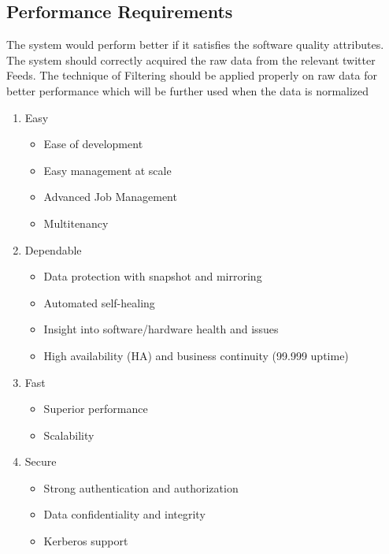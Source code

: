 \documentclass[oneside,a4paper,12pt]{book}
\begin{document}
\subsection{Performance Requirements}
The system would perform better if it satisfies the software quality attributes. The system should correctly acquired the raw data from the relevant twitter Feeds. The technique of Filtering should be applied properly on raw data for better performance which will be further used when the data is normalized
\begin{enumerate}
    \item Easy
        \begin{itemize}
            \item Ease of development
            \item Easy management at scale
            \item Advanced Job  Management
            \item Multitenancy
        \end{itemize}
        \item Dependable
        \begin{itemize}
            \item Data protection with snapshot and mirroring
            \item Automated self-healing
            \item Insight into software/hardware health and issues
            \item High availability (HA) and business continuity (99.999 uptime)
        \end{itemize}
        \item Fast
             \begin{itemize}
            \item Superior performance
            \item Scalability
        \end{itemize}
        \item Secure
             \begin{itemize}
            \item Strong authentication and authorization
            \item Data confidentiality and integrity
            \item Kerberos support
        \end{itemize}
\end{enumerate}
\end{document}
